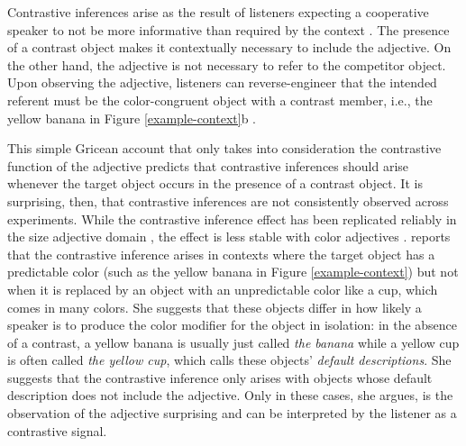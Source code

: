 \documentclass[10pt,letterpaper]{article}
\newcommand{\ek}[1]{\textcolor{Orange}{[ek: #1]}}
\newcommand{\figref}[1]{Figure \ref{#1}}
\begin{document}

Contrastive inferences arise as the result of listeners expecting a cooperative speaker to not be more informative than required by the context \cite{Grice:1975}. The presence of a contrast object makes it contextually necessary to include the adjective. On the other hand, the adjective is not necessary to refer to the competitor object. Upon observing the adjective, listeners can reverse-engineer that the intended referent must be the color-congruent object with a contrast member, i.e., the yellow banana in \figref{example-context}b \cite{Aparicio:2016,Aparicio:2018,Grodner:2005,Grodner:2011,Ryskin:2019,Sedivy:1999}.

This simple Gricean account that only takes into consideration the contrastive function of the adjective predicts that contrastive inferences should arise whenever the target object occurs in the presence of a contrast object. It is surprising, then, that contrastive inferences are not consistently observed across experiments. While the contrastive inference effect has been replicated reliably in the size adjective domain \cite{Aparicio:2016,Aparicio:2018,Grodner:2011,Ryskin:2019,Sedivy:1999}, the effect is less stable with color adjectives \cite{Sedivy:2003}.  reports that the contrastive inference arises in contexts where the target object has a predictable color (such as the yellow banana in \figref{example-context}) but not when it is replaced by an object with an unpredictable color like a cup, which comes in many colors.
She suggests that these objects differ in how likely a speaker is to produce the color modifier for the object in isolation: in the absence of a contrast, a yellow banana is usually just called \textit{the banana} while a yellow cup is often called \textit{the yellow cup}, which  calls these objects' \emph{default descriptions}. She suggests that the contrastive inference only arises with objects whose default description does not include the adjective. Only in these cases, she argues, is the observation of the adjective surprising and can be interpreted by the listener as a contrastive signal.
\end{document}
